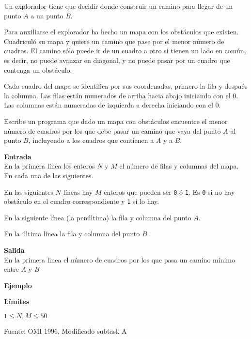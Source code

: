 Un explorador tiene que decidir donde construir un camino para llegar de un punto \(A\) a un punto \(B\). 

Para auxiliarse el explorador ha hecho un mapa con los obstáculos que existen. Cuadriculó su mapa y quiere un camino que pase por el menor número de cuadros. El camino sólo puede ir de un cuadro a otro si tienen un lado en común, es decir, no puede avanzar en diagonal, y no puede pasar por un cuadro que contenga un obstáculo. 

Cada cuadro del mapa se identifica por sus coordenadas, primero la fila y después la columna. Las filas están numerados de arriba hacia abajo iniciando con el \(0\). Las columnas están numeradas de izquierda a derecha iniciando con el \(0\).

Escribe un programa que dado un mapa con obstáculos encuentre el menor número de cuadros por los que debe pasar un camino que vaya del punto \(A\) al punto \(B\), incluyendo a los cuadros que contienen a \(A\) y a \(B\).

\textbf{Entrada}\\
En la primera línea los enteros \(N\) y \(M\) el número de filas y columnas del mapa. En cada una de las siguientes.

En las siguientes \(N\) líneas hay \(M\) enteros que pueden ser \verb|0| ó \verb|1|. Es \verb|0| si no hay obstáculo en el cuadro correspondiente y \verb|1| si lo hay.

En la siguiente línea (la penúltima) la fila y columna del punto \(A\).

En la última línea la fila y columna del punto \(B\).

\textbf{Salida}\\
En la primera linea el número de cuadros por los que pasa un camino mínimo entre \(A\) y \(B\)

\textbf{Ejemplo}\\
\begin{casebox2}
\end{casebox2}

\textbf{Límites}
\begin{plimits}
	\item \(1 \leq N, M\leq 50\)
\end{plimits}

Fuente: OMI 1996, Modificado subtask A

